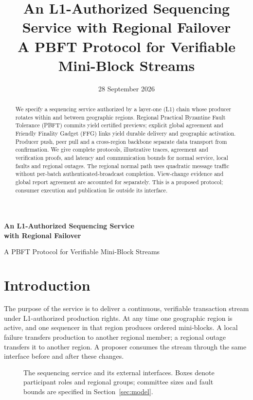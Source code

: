 \documentclass[11pt,a4paper,onecolumn]{article}
\title{An L1-Authorized Sequencing Service with Regional Failover\\
\large A PBFT Protocol for Verifiable Mini-Block Streams}
\author{}\date{28 September 2026}
\theoremstyle{remark}\newtheorem{example}[definition]{Example}
\newcounter{protocol}
\begin{document}
\begin{center}
{\Large\bfseries An L1-Authorized Sequencing Service\\with Regional Failover\par}
\vspace{.5em}
{\normalsize A PBFT Protocol for Verifiable Mini-Block Streams\par}
\vspace{.4em}{\small 28 September 2026}
\end{center}
\begin{abstract}
We specify a sequencing service authorized by a layer-one (L1) chain whose
producer rotates within and between geographic regions. Regional Practical
Byzantine Fault Tolerance (PBFT) commits yield certified previews; explicit
global agreement and Friendly Finality Gadget (FFG) links yield durable
delivery and geographic activation. Producer push, peer pull and a cross-region backbone separate data
transport from confirmation. We give complete protocols, illustrative traces,
agreement and verification proofs, and latency and communication bounds for
normal service, local faults and regional outages. The regional normal path uses
quadratic message traffic without per-batch authenticated-broadcast completion.
View-change evidence and global report agreement are accounted for separately.
This is a proposed protocol;
consumer execution and publication lie outside its interface.
\end{abstract}

\section{Introduction}\label{sec:intro}
The purpose of the service is to deliver a continuous, verifiable transaction
stream under L1-authorized production rights. At any time one geographic region
is active, and one sequencer in that region produces ordered mini-blocks.
A local failure transfers production to another regional member; a regional
outage transfers it to another region. A proposer consumes the stream through
the same interface before and after these changes. 

\begin{figure}[H]\centering

\caption{The sequencing service and its external interfaces. Boxes denote participant roles and regional groups; committee sizes and
fault bounds are specified in Section~\ref{sec:model}.}
\label{fig:architecture}
\end{figure}
\end{document}
